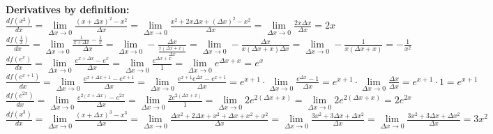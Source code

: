 \documentclass[12pt,a4paper]{report}
\begin{document}
	\textbf{Derivatives by definition:}\\
	$\frac{df(x^2)}{dx} = \lim\limits_{\Delta x \to 0}\frac{(x+\Delta x)^2 - x^2}{\Delta x} = \lim\limits_{\Delta x \to 0}\frac{x^2 + 2x \Delta x+ (\Delta x)^2-x^2}{\Delta x} = \lim\limits_{\Delta x \to 0}\frac{2x \Delta x}{ \Delta x} = 2x$\\
	$\frac{df(\frac{1}{x})}{dx} = \lim\limits_{\Delta x \to 0} \frac{\frac{1}{x + \Delta x} - \frac{1}{x}}{\Delta x} = \lim\limits_{\Delta x \to 0} -\frac{\Delta x}{\frac{x (\Delta x + x)}{\Delta x}} = \lim\limits_{\Delta x \to 0} -\frac{\Delta x}{x (\Delta x + x) \Delta x} = \lim\limits_{\Delta x \to 0} -\frac{1}{x (\Delta x + x)} = -\frac{1}{x^2}$\\
	$\frac{df(e^x)}{dx} = \lim\limits_{\Delta x \to 0} \frac{e^{x+\Delta x} - e^x}{\Delta x} = \lim\limits_{\Delta x \to 0} \frac{e^{\Delta x + x}}{1} = \lim\limits_{\Delta x \to 0} e^{\Delta x + x} = e^x$\\
	$\frac{df(e^{x+1})}{dx} = \lim\limits_{\Delta x \to 0} \frac{e^{x+\Delta x + 1} - e^{x+1}}{\Delta x} = \lim\limits_{\Delta x \to 0} \frac{e^{x+1}e^{\Delta x} - e^{x+1}}{\Delta x} = e^{x+1} \cdot \lim\limits_{\Delta x \to 0} \frac{e^{\Delta x} - 1}{\Delta x} = e^{x+1} \cdot \lim\limits_{\Delta x \to 0} \frac{\Delta x}{\Delta x} = e^{x+1} \cdot 1 = e^{x+1}$\\
	$\frac{df(e^{2x})}{dx} = \lim\limits_{\Delta x \to 0} \frac{e^{2(x+\Delta x)} - e^{2x}}{\Delta x} = \lim\limits_{\Delta x \to 0} \frac{2e^{2(\Delta x + x)}}{1} = \lim\limits_{\Delta x \to 0} 2e^{2(\Delta x + x)} = \lim\limits_{\Delta x \to 0} 2e^{2(\Delta x + x)} = 2e^{2x}$\\
	$\frac{df(x^3)}{dx} = \lim\limits_{\Delta x \to 0} \frac{(x+\Delta x)^3 - x^3}{\Delta x} = \lim\limits_{\Delta x \to 0} \frac{\Delta x^2 + 2\Delta x + x^2 + \Delta x + x^2 + x^2}{\Delta x} = \lim\limits_{\Delta x \to 0} \frac{3x^2 + 3\Delta x + \Delta x^2}{\Delta x} = \lim\limits_{\Delta x \to 0} \frac{3x^2 + 3\Delta x + \Delta x^2}{\Delta x} = 3x^2$\\
	
\end{document}
